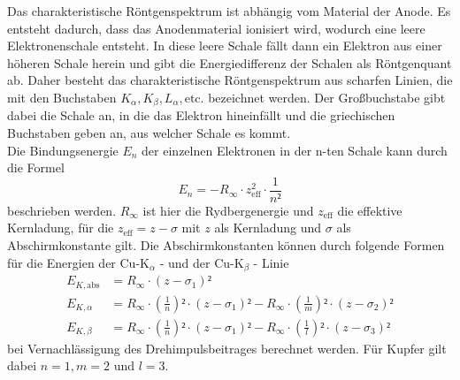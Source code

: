 Das charakteristische Röntgenspektrum ist abhängig vom Material der Anode. Es entsteht dadurch, dass das Anodenmaterial ionisiert wird, wodurch eine leere 
Elektronenschale entsteht. In diese leere Schale fällt dann ein Elektron aus einer höheren Schale herein und gibt die Energiedifferenz der Schalen als Röntgenquant 
ab. Daher besteht das charakteristische Röntgenspektrum aus scharfen Linien, die mit den Buchstaben $K_\alpha, K_\beta, L_\alpha, \text{etc.}$ bezeichnet werden. Der
Großbuchstabe gibt dabei die Schale an, in die das Elektron hineinfällt und die griechischen Buchstaben geben an, aus welcher Schale es kommt. \\
Die Bindungsenergie $E_n$ der einzelnen Elektronen in der n-ten Schale kann durch die Formel 
\begin{equation}
E_n = - R_{\infty} \cdot z^{2}_{\text{eff}} \cdot \frac{1}{n²}
\label{Bindungsenergie_Elektronen}
\end{equation}
beschrieben werden. $R_{\infty}$ ist hier die Rydbergenergie und $z_{\text{eff}}$ die effektive Kernladung, für die $z_{\text{eff}} = z - \sigma$ mit $z$ als Kernladung 
und $\sigma$ als Abschirmkonstante gilt. 
Die Abschirmkonstanten können durch folgende Formen für die Energien der $\text{Cu-K}_\alpha$ - und der $\text{Cu-K}_{\beta}$ - Linie 
\begin{align}
    E_{K,\text{abs}} &= R_{\infty} \cdot \left(z - \sigma_1\right)² \label{eqn:Kupfer_Linien_Energien_abs} \\
    E_{K,\alpha} &= R_{\infty} \cdot \left(\frac{1}{n}\right)² \cdot \left(z - \sigma_1\right)² - R_{\infty} \cdot \left(\frac{1}{m}\right)² \cdot \left(z - \sigma_2\right)² \label{eqn:Kupfer_Linien_Energien_alpha}\\
    E_{K,\beta} &= R_{\infty} \cdot \left(\frac{1}{n}\right)² \cdot \left(z - \sigma_1\right)² - R_{\infty} \cdot \left(\frac{1}{l}\right)² \cdot \left(z - \sigma_3\right)² \label{eqn:Kupfer_Linien_Energien_beta}
 \end{align}
bei Vernachlässigung des Drehimpulsbeitrages berechnet werden. Für Kupfer gilt dabei $n = 1, m = 2$ und $l = 3$. \\


